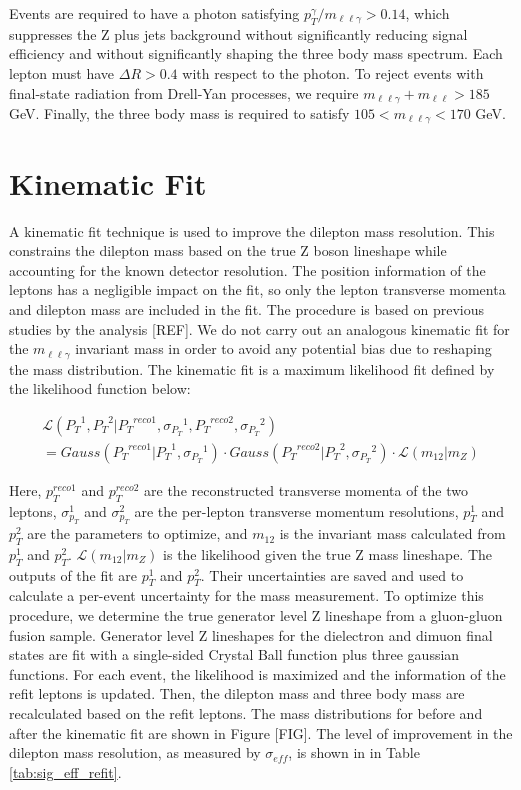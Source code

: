 Events are required to have a photon satisfying $p_{T}^{\gamma}/m_{\ell\ell\gamma} > 0.14$, which suppresses the Z plus jets 
background without significantly reducing signal efficiency and without significantly shaping the three body mass spectrum.
Each lepton must have $\Delta R > 0.4$ with respect to the photon. To reject events with final-state radiation from 
Drell-Yan processes, we require $m_{\ell\ell\gamma} + m_{\ell\ell} > 185$ GeV. Finally, the three body mass is required to 
satisfy $105 < m_{\ell\ell\gamma} < 170$ GeV. 

\section{Kinematic Fit}
A kinematic fit technique is used to improve the dilepton mass resolution. This constrains the dilepton mass based on the true 
Z boson lineshape while accounting for the known detector resolution. The position information of the leptons has a negligible impact
on the fit, so only the lepton transverse momenta and dilepton mass are included in the fit. The procedure is based on previous
studies by the \hzz analysis [REF]. We do not carry out an analogous kinematic fit for the $m_{\ell\ell\gamma}$ invariant 
mass in order to avoid any potential bias due to reshaping the mass distribution. The kinematic fit is a maximum likelihood fit 
defined by the likelihood function below: 

\begin{equation}
\begin{aligned}
\mathcal{L}({P_{T}}^{1},{P_{T}}^{2}|{P_{T}}^{reco1},{\sigma_{P_{T}}}^1,{P_{T}}^{reco2},{\sigma_{P_{T}}}^2) \\
=Gauss({P_{T}}^{reco1}|{P_{T}}^{1},{\sigma_{P_{T}}}^1)\cdot Gauss({P_{T}}^{reco2}|{P_{T}}^{2},{\sigma_{P_{T}}}^2)\cdot\mathcal{L}(m_{12}|m_{Z})
\end{aligned}
\end{equation}

Here, $p_{T}^{reco1}$ and $p_{T}^{reco2}$ are the reconstructed transverse momenta of the two leptons, 
$\sigma_{p_{T}}^{1}$ and $\sigma_{p_{T}}^{2}$ are the per-lepton transverse momentum resolutions, 
$p_{T}^{1}$ and $p_{T}^{2}$ are the parameters to optimize, and $m_{12}$ is the invariant mass 
calculated from $p_{T}^{1}$ and $p_{T}^{2}$. $\mathcal{L}(m_{12}|m_{Z})$ is the likelihood given the true Z mass lineshape. 
The outputs of the fit are $p_{T}^{1}$ and $p_{T}^{2}$.
Their uncertainties are saved and used to calculate a per-event uncertainty for the mass measurement.
To optimize this procedure, we determine the true generator level Z lineshape from a gluon-gluon fusion \hzg sample.
Generator level Z lineshapes for the dielectron and dimuon final states are fit with 
a single-sided Crystal Ball function plus three gaussian functions.
For each event, the likelihood is maximized and the \pT information of the refit leptons is updated. 
Then, the dilepton mass and three body mass are recalculated based on the refit leptons.
The mass distributions for before and after the kinematic fit are shown in Figure [FIG]. The level of improvement in the 
dilepton mass resolution, 
as measured by $\sigma_{eff}$, is shown in in Table \ref{tab:sig_eff_refit}.

